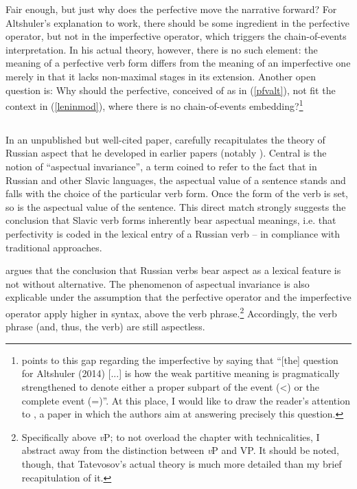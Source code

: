 \documentclass[output=paper,colorlinks,citecolor=brown]{langscibook}
\begin{document}
\noindent Fair enough, but just why does the perfective move the narrative forward? For Altshuler's explanation to work, there should be some ingredient in the perfective operator, but not in the imperfective operator, which triggers the chain-of-events interpretation. In his actual theory, however, there is no such element: the meaning of a perfective verb form differs from the meaning of an imperfective one merely in that it lacks non-maximal stages in its extension. Another open question is: Why should the perfective, conceived of as in (\ref{pfvalt}), not fit the context in (\ref{leninmod}), where there is no chain-of-events embedding?\footnote{\citet[187]{gronn15} points to this gap regarding the imperfective by saying that ``[the] question for Altshuler (2014) [...] is how the weak partitive meaning is pragmatically strengthened to denote either a proper subpart of the event (<) or the complete event (=)''. 
At this place, I would like to draw the reader's attention to \citet{GyarmathyAltshuler2020}, a paper in which the authors aim at answering precisely this question.}  

\subsection{\citet{Tatevosov2011,Tate15,Tate17}}\label{ssec:tate} 

In an unpublished but 
well-cited paper, \citet{Tate17} carefully recapitulates the theory of Russian aspect that 
he developed in earlier papers (notably \citealt{Tatevosov2011,Tate15}). Central is the notion of ``aspectual invariance'', a term coined to refer to the fact that in Russian and other Slavic languages, the aspectual value of a sentence stands and falls with the choice of the particular verb form. Once the form of the verb is set, so is the aspectual value of the sentence. This direct match strongly suggests the conclusion that Slavic verb forms inherently bear aspectual meanings, i.e. that perfectivity is coded in the lexical entry of a Russian verb -- in compliance with traditional approaches.

\citet{Tate17} argues that the conclusion that Russian verbs bear aspect as a lexical feature is not without alternative.
The phenomenon of aspectual invariance is also explicable under the assumption that the perfective operator and the imperfective operator apply higher in syntax, above the verb phrase.\footnote{\label{coarse}Specifically above \textit{v}P; to not overload the chapter with technicalities, I abstract away from the distinction between \textit{v}P and VP. It should be noted, though, that Tatevosov's actual theory is much more detailed than my brief recapitulation of it.} Accordingly, the verb phrase (and, thus, the verb) are still aspectless.
\end{document}
